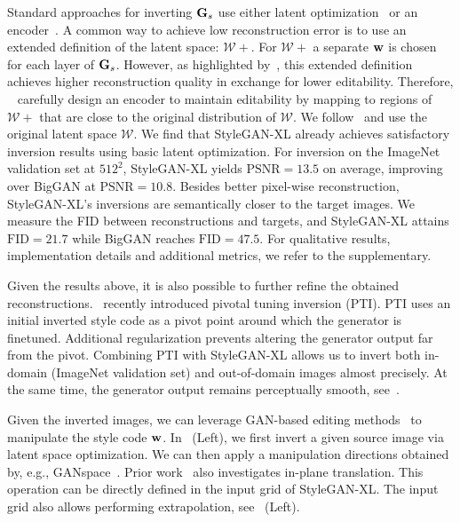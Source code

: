 Standard approaches for inverting $\mathbf{G}_s$ use either latent optimization~\cite{Abdal2019ICCV,Creswell2019NEURAL,Karras2020CVPR} or an encoder~\cite{Perarnau2016ARXIV,Alaluf2021ICCV,Tov2021TOG}. A common way to achieve low reconstruction error is to use an extended definition of the latent space: $\mathcal{W}+$. For $\mathcal{W}+$ a separate $\mathbf{w}$ is chosen for each layer of $\mathbf{G}_s$. However, as highlighted by~\cite{Zhu2020ECCV,Tov2021TOG}, this extended definition achieves higher reconstruction quality in exchange for lower editability. Therefore, ~\cite{Tov2021TOG} carefully design an encoder to maintain editability by mapping to regions of $\mathcal{W}+$ that are close to the original distribution of $\mathcal{W}$.
We follow~\cite{Karras2020CVPR} and use the original latent space $\mathcal{W}$.
We find that StyleGAN-XL already achieves satisfactory inversion results using basic latent optimization.
For inversion on the ImageNet validation set at $512^2$, StyleGAN-XL yields $\text{PSNR}=13.5$ on average, improving over BigGAN at $\text{PSNR}=10.8$. 
Besides better pixel-wise reconstruction, StyleGAN-XL's inversions are
semantically closer to the target images.
We measure the FID between reconstructions and targets, and StyleGAN-XL attains $\text{FID}=21.7$ while BigGAN reaches $\text{FID}=47.5$. 
For qualitative results, implementation details and additional metrics, we refer to the supplementary.

Given the results above, it is also possible to further refine the obtained reconstructions.~\cite{Roich2021ARXIV} recently introduced pivotal tuning inversion (PTI). PTI uses an initial inverted style code as a pivot point around which the generator is finetuned. Additional regularization prevents altering the generator output far from the pivot. Combining PTI with StyleGAN-XL allows us to invert both in-domain (ImageNet validation set) and out-of-domain images almost precisely. At the same time, the generator output remains perceptually smooth, see~.
\interpolations

Given the inverted images, we can leverage GAN-based editing methods~\cite{Voynov2020ICML,Haerkoenen2020NEURIPS,Shen2021CVPR,Kocasari2021WACV,Spingarn2021ICLR} to manipulate the style code $\mathbf{w}$. In ~(Left), we first invert a given source image via latent space optimization. 
We can then apply a manipulation directions obtained by, e.g., GANspace~\cite{Haerkoenen2020NEURIPS}.
Prior work~\cite{Jahanian2020ICLR} also investigates in-plane translation. This operation can be directly defined in the input grid of StyleGAN-XL. The input grid also allows performing extrapolation, see  ~(Left).

